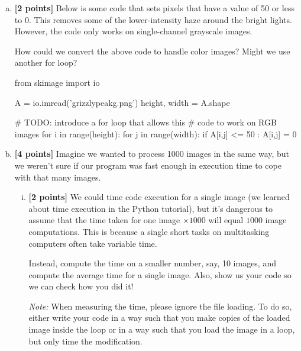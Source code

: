\documentclass[11pt]{article}
\begin{document}
\begin{enumerate}[(a)]
    \item 
\textbf{[2 points]}
Below is some code that sets pixels that have a value of 50 or less to 0. This removes some of the lower-intensity haze around the bright lights. However, the code only works on single-channel grayscale images.

\begin{tcolorbox}[colback=orange!5!white,colframe=orange!75!black]
How could we convert the above code to handle color images? Might we use another for loop?
\end{tcolorbox}

\begin{tcolorbox}[enhanced jigsaw,pad at break*=1mm,colback=white!5!white,colframe=green!75!black,height=10cm]
\begin{python}
from skimage import io

A = io.imread('grizzlypeakg.png')
height, width = A.shape

# TODO: introduce a for loop that allows this 
# code to work on RGB images
for i in range(height):
    for j in range(width):
        if A[i,j] <= 50 :
            A[i,j] = 0
\end{python}
\end{tcolorbox}

\item \textbf{[4 points]} Imagine we wanted to process 1000 images in the same way, but we weren't sure if our program was fast enough in execution time to cope with that many images. 

\begin{enumerate}[(i)]
    \item \textbf{[2 points]} We could time code execution for a single image (we learned about time execution in the Python tutorial), but it's dangerous to assume that the time taken for one image $\times1000$ will equal $1000$ image computations. This is because a single short tasks on multitasking computers often take variable time. 

\begin{tcolorbox}[colback=orange!5!white,colframe=orange!75!black]
Instead, compute the time on a smaller number, say, 10 images, and compute the average time for a single image. Also, show us your code so we can check how you did it!
\end{tcolorbox}

\emph{Note: } When measuring the time, please ignore the file loading. To do so, either write your code in a way such that you make copies of the loaded image inside the loop or in a way such that you load the image in a loop, but only time the modification.


\end{enumerate}
\end{enumerate}
\end{document}
